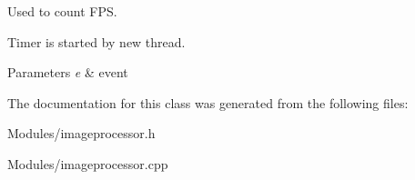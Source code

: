 Used to count FPS. 

Timer is started by new thread. 
\begin{DoxyParams}{Parameters}
{\em e} & event \\
\hline
\end{DoxyParams}


The documentation for this class was generated from the following files:\begin{DoxyCompactItemize}
\item 
Modules/imageprocessor.h\item 
Modules/imageprocessor.cpp\end{DoxyCompactItemize}
